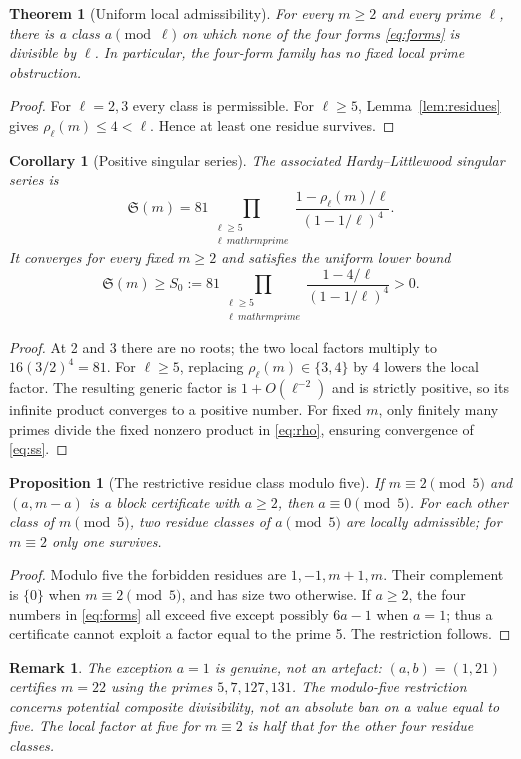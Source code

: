 \documentclass[11pt,a4paper]{article}
\numberwithin{equation}{section}
\newtheorem{theorem}[conjecture]{Theorem}
\newtheorem{proposition}[conjecture]{Proposition}
\newtheorem{corollary}[conjecture]{Corollary}
\newtheorem{remark}[conjecture]{Remark}
\theoremstyle{definition}
\newcommand{\SM}{\mathfrak{S}}
\begin{document}
\begin{theorem}[Uniform local admissibility]\label{thm:admissible}
For every \(m\ge2\) and every prime \(\ell\), there is a class \(a\pmod\ell\) on which none of the four forms \eqref{eq:forms} is divisible by \(\ell\). In particular, the four-form family has no fixed local prime obstruction.
\end{theorem}
\begin{proof}
For \(\ell=2,3\) every class is permissible. For \(\ell\ge5\), Lemma~\ref{lem:residues} gives \(\rho_\ell(m)\le4<\ell\). Hence at least one residue survives.
\end{proof}
\begin{corollary}[Positive singular series]\label{cor:ss}
The associated Hardy--Littlewood singular series is
\begin{equation}\label{eq:ss}
\SM(m)=81\prod_{\substack{\ell\ge5\\ \ell\ mathrm{prime}}}
\frac{1-\rho_\ell(m)/\ell}{(1-1/\ell)^4}.
\end{equation}
It converges for every fixed \(m\ge2\) and satisfies the uniform lower bound
\begin{equation}\label{eq:lower}
\SM(m)\ge S_0:=81\prod_{\substack{\ell\ge5\\ \ell\ mathrm{prime}}}
\frac{1-4/\ell}{(1-1/\ell)^4}>0.
\end{equation}
\end{corollary}
\begin{proof}
At 2 and 3 there are no roots; the two local factors multiply to \(16(3/2)^4=81\). For \(\ell\ge5\), replacing \(\rho_\ell(m)\in\{3,4\}\) by 4 lowers the local factor. The resulting generic factor is \(1+O(\ell^{-2})\) and is strictly positive, so its infinite product converges to a positive number. For fixed \(m\), only finitely many primes divide the fixed nonzero product in \eqref{eq:rho}, ensuring convergence of \eqref{eq:ss}.
\end{proof}

\begin{proposition}[The restrictive residue class modulo five]\label{prop:five}
If \(m\equiv2\pmod5\) and \((a,m-a)\) is a block certificate with \(a\ge2\), then \(a\equiv0\pmod5\). For each other class of \(m\pmod5\), two residue classes of \(a\pmod5\) are locally admissible; for \(m\equiv2\) only one survives.
\end{proposition}
\begin{proof}
Modulo five the forbidden residues are \(1,-1,m+1,m\). Their complement is \(\{0\}\) when \(m\equiv2\pmod5\), and has size two otherwise. If \(a\ge2\), the four numbers in \eqref{eq:forms} all exceed five except possibly \(6a-1\) when \(a=1\); thus a certificate cannot exploit a factor equal to the prime 5. The restriction follows.
\end{proof}
\begin{remark}
The exception \(a=1\) is genuine, not an artefact: \((a,b)=(1,21)\) certifies \(m=22\) using the primes \(5,7,127,131\). The modulo-five restriction concerns potential \emph{composite divisibility}, not an absolute ban on a value equal to five. The local factor at five for \(m\equiv2\) is half that for the other four residue classes.
\end{remark}
\end{document}
